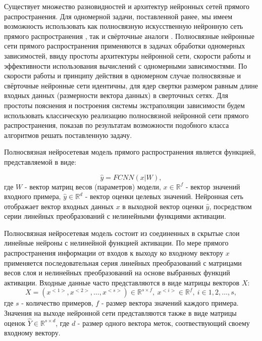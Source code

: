 \documentclass{article}
\begin{document}
	Существует множество разновидностей и архитектур нейронных сетей прямого распространения. Для одномерной задачи, поставленной ранее, мы имеем возможность использовать как полносвязную искусственную нейронную сеть прямого распространения \cite{lit11,lit12,lit13}, так и свёрточные аналоги \cite{lit14,lit15}. Полносвязные нейронные сети прямого распространения применяются в задачах обработки одномерных зависимостей, ввиду простоты архитектуры нейронной сети, скорости работы и эффективности использования вычислений с одномерными зависимостями. По скорости работы и принципу действия в одномерном случае полносвязные и свёрточные нейронные сети идентичны, для ядер свертки размером равным длине входных данных (размерности вектора данных) в сверточных сетях. Для простоты пояснения и построения системы экстраполяции зависимости будем использовать классическую реализацию полносвязной нейронной сети прямого распространения, показав по результатам возможности подобного класса алгоритмов решать поставленную задачу.
	
	Полносвязная нейросетевая модель прямого распространения является функцией, представляемой в виде:

	\begin{equation} \label{FCNN}
		\hat{y} = FCNN(x|W), 
	\end{equation}
	где $W$ - вектор матриц весов (параметров) модели, $x\in \mathbb{R}^{f}$ - вектор значений входного примера, $\hat{y}\in \mathbb{R}^{d}$ - вектор оценки целевых значений. Нейронная сеть отображает вектор входных данных $x$  в выходной вектор оценки $\hat{y}$, посредством серии линейных преобразований с нелинейными функциями активации.
	
	Полносвязная нейросетевая модель состоит из соединенных в скрытые слои линейные нейроны с нелинейной функцией активации. По мере прямого распространения информации от входов к выходу ко входному вектору $x$ применяется последовательная серия линейных преобразований с матрицами весов слоя и нелинейных преобразований на основе выбранных функций активации. Входные данные часто представляются в виде матрицы векторов $X$:	
	\begin{equation}\label{X_input}
		X = (x^{<1>}, x^{<2>}, \dots, x^{<s>}) \in \mathbb{R}^{s \times f}, \ x^{<i>} \in \mathbb{R}^{f},\ i\in 1, 2, \dots, s,
	\end{equation}
	где $s$ - количество примеров, $f$ - размер вектора значений каждого примера.
	Значения на выходе нейронной сети представляются также в виде матрицы оценок $\hat{Y} \in \mathbb{R}^{s\times d}$, где $d$ - размер одного вектора меток, соотвествующий своему входному вектору. 
	
\end{document}
